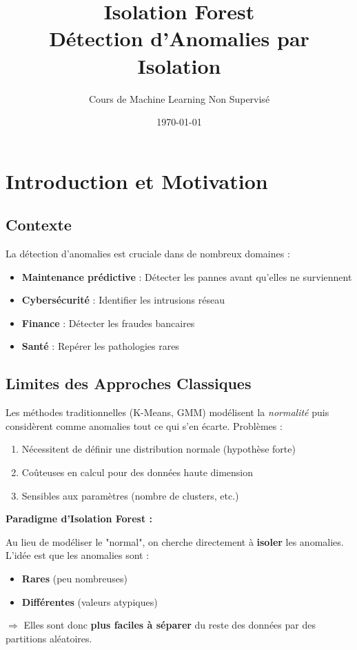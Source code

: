 \documentclass[a4paper,11pt]{article}
\title{\textbf{Isolation Forest} \\ \large Détection d'Anomalies par Isolation}
\author{Cours de Machine Learning Non Supervisé}
\date{\today}
\begin{document}
\maketitle
\tableofcontents
\newpage

\section{Introduction et Motivation}

\subsection{Contexte}
La détection d'anomalies est cruciale dans de nombreux domaines :
\begin{itemize}
    \item \textbf{Maintenance prédictive} : Détecter les pannes avant qu'elles ne surviennent
    \item \textbf{Cybersécurité} : Identifier les intrusions réseau
    \item \textbf{Finance} : Détecter les fraudes bancaires
    \item \textbf{Santé} : Repérer les pathologies rares
\end{itemize}

\subsection{Limites des Approches Classiques}
Les méthodes traditionnelles (K-Means, GMM) modélisent la \textit{normalité} puis considèrent comme anomalies tout ce qui s'en écarte. Problèmes :
\begin{enumerate}
    \item Nécessitent de définir une distribution normale (hypothèse forte)
    \item Coûteuses en calcul pour des données haute dimension
    \item Sensibles aux paramètres (nombre de clusters, etc.)
\end{enumerate}

\begin{conceptbox}
\textbf{Paradigme d'Isolation Forest :}

Au lieu de modéliser le "normal", on cherche directement à \textbf{isoler} les anomalies. L'idée est que les anomalies sont :
\begin{itemize}
    \item \textbf{Rares} (peu nombreuses)
    \item \textbf{Différentes} (valeurs atypiques)
\end{itemize}
$\Rightarrow$ Elles sont donc \textbf{plus faciles à séparer} du reste des données par des partitions aléatoires.
\end{conceptbox}
\end{document}

